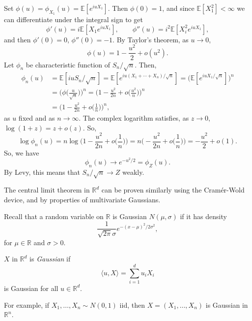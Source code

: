 \documentclass[12pt]{article}
\begin{document}
\begin{proofbox}
	Set $\phi(u) = \phi_{X_1}(u) = \mathbb{E}[e^{i u X_1}]$. Then $\phi(0) = 1$, and since $\mathbb{E}[X_1^2] < \infty$ we can differentiate under the integral sign to get
	\[
	\phi'(u) = i \mathbb{E}[X_1 e^{i u X_1}], \qquad \phi''(u) = i^2 \mathbb{E}[X_i^2 e^{i u X_1}],
	\]
	and then $\phi'(0) = 0$, $\phi''(0) = -1$. By Taylor's theorem, as $u \to 0$,
	\[
	\phi(u) = 1 - \frac{u^2}{2} + o(u^2).
	\]
	Let $\phi_n$ be characteristic function of $S_n/\sqrt n$. Then,
	\begin{align*}
		\phi_n(u) &= \mathbb{E}[iu S_n/\sqrt n] = \mathbb{E}[e^{i u(X_1 + \cdots + X_n)/\sqrt n}] = \bigl( \mathbb{E}[e^{iu X_1/\sqrt n}] \bigr)^n \\
			  &= \biggl( \phi\biggl(\frac{u}{\sqrt n} \biggr) \biggr)^n = \biggl(1 - \frac{u^2}{2n} + o \biggl( \frac{u^2}{n} \biggr) \biggr)^n \\
			  &= \biggl(1 - \frac{u^2}{2n} + o \biggl( \frac{1}{n} \biggr) \biggr)^n,
	\end{align*}
	as $u$ fixed and as $n \to \infty$. The complex logarithm satisfies, as $z \to 0$, $\log(1 + z) = z + o(z)$. So,
	\[
	\log \phi_n(u) = n \log \biggl(1 - \frac{u^2}{2n} + o \biggl( \frac{1}{n} \biggr) \biggr) = n \biggl( - \frac{u^2}{2n} + o \biggl( \frac{1}{n} \biggr) \biggr) = - \frac{u^2}{2} + o(1).
	\]
	So, we have
	\[
	\phi_n(u) \to e^{-u^2/2} = \phi_Z(u).
	\]
	By Levy, this means that $S_n/\sqrt n \to Z$ weakly.
\end{proofbox}

\begin{remark}
	The central limit theorem in $\mathbb{R}^d$ can be proven similarly using the Cram\'er-Wold device, and by properties of multivariate Gaussians.
\end{remark}

Recall that a random variable on $\mathbb{R}$ is Gaussian $N(\mu, \sigma)$ if it has density
\[
	\frac{1}{\sqrt{2\pi}\sigma} e^{-(x - \mu)^2/2\sigma^2},
\]
for $\mu \in \mathbb{R}$ and $\sigma > 0$.

\begin{definition}
	$X$ in $\mathbb{R}^d$ is \emph{Gaussian} if
	\[
	\langle u, X\rangle = \sum_{i = 1}^d u_i X_i
	\]
	is Gaussian for all $u \in \mathbb{R}^d$.
\end{definition}

For example, if $X_1, \ldots, X_n \sim N(0, 1)$ iid, then $X = (X_1, \ldots, X_n)$ is Gaussian in $\mathbb{R}^n$.
\end{document}
